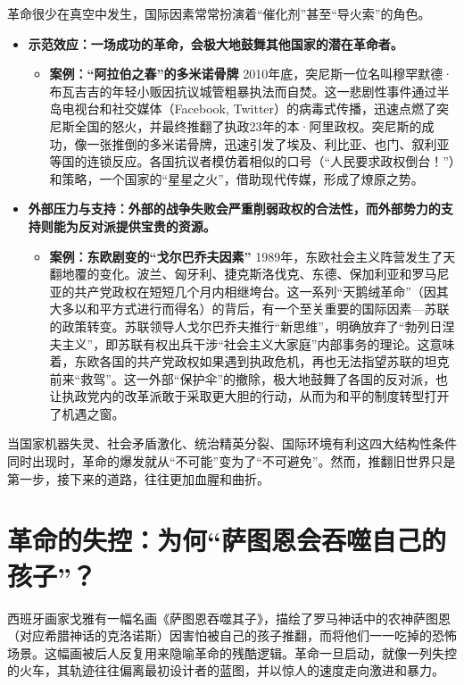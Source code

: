 革命很少在真空中发生，国际因素常常扮演着“催化剂”甚至“导火索”的角色。
\begin{itemize}
\item \textbf{示范效应：一场成功的革命，会极大地鼓舞其他国家的潜在革命者。}
    \begin{itemize}
    \item \textbf{案例：“阿拉伯之春”的多米诺骨牌}
        2010年底，突尼斯一位名叫穆罕默德·布瓦吉吉的年轻小贩因抗议城管粗暴执法而自焚。这一悲剧性事件通过半岛电视台和社交媒体（Facebook, Twitter）的病毒式传播，迅速点燃了突尼斯全国的怒火，并最终推翻了执政23年的本·阿里政权。突尼斯的成功，像一张推倒的多米诺骨牌，迅速引发了埃及、利比亚、也门、叙利亚等国的连锁反应。各国抗议者模仿着相似的口号（“人民要求政权倒台！”）和策略，一个国家的“星星之火”，借助现代传媒，形成了燎原之势。
    \end{itemize}
\item \textbf{外部压力与支持：外部的战争失败会严重削弱政权的合法性，而外部势力的支持则能为反对派提供宝贵的资源。}
    \begin{itemize}
    \item \textbf{案例：东欧剧变的“戈尔巴乔夫因素”}
        1989年，东欧社会主义阵营发生了天翻地覆的变化。波兰、匈牙利、捷克斯洛伐克、东德、保加利亚和罗马尼亚的共产党政权在短短几个月内相继垮台。这一系列“天鹅绒革命”（因其大多以和平方式进行而得名）的背后，有一个至关重要的国际因素---苏联的政策转变。苏联领导人戈尔巴乔夫推行“新思维”，明确放弃了“勃列日涅夫主义”，即苏联有权出兵干涉“社会主义大家庭”内部事务的理论。这意味着，东欧各国的共产党政权如果遇到执政危机，再也无法指望苏联的坦克前来“救驾”。这一外部“保护伞”的撤除，极大地鼓舞了各国的反对派，也让执政党内的改革派敢于采取更大胆的行动，从而为和平的制度转型打开了机遇之窗。
    \end{itemize}
\end{itemize}

当国家机器失灵、社会矛盾激化、统治精英分裂、国际环境有利这四大结构性条件同时出现时，革命的爆发就从“不可能”变为了“不可避免”。然而，推翻旧世界只是第一步，接下来的道路，往往更加血腥和曲折。

\section{ 革命的失控：为何“萨图恩会吞噬自己的孩子”？}

西班牙画家戈雅有一幅名画《萨图恩吞噬其子》，描绘了罗马神话中的农神萨图恩（对应希腊神话的克洛诺斯）因害怕被自己的孩子推翻，而将他们一一吃掉的恐怖场景。这幅画被后人反复用来隐喻革命的残酷逻辑。革命一旦启动，就像一列失控的火车，其轨迹往往偏离最初设计者的蓝图，并以惊人的速度走向激进和暴力。

